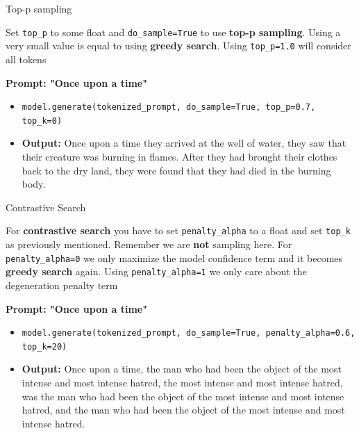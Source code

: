 \documentclass[11pt,compress,t,notes=noshow, xcolor=table]{beamer}
\begin{document}

\begin{vbframe}{Top-p sampling}

\vfill

Set \texttt{top\_p} to some float and \texttt{do\_sample=True} to use \textbf{top-p sampling}. Using a very small value is equal to using \textbf{greedy search}. Using \texttt{top\_p=1.0} will consider all tokens

\textbf{Prompt: "Once upon a time"}

\begin{itemize}
    \item \texttt{model.generate(tokenized\_prompt, do\_sample=True, top\_p=0.7, top\_k=0)}
    \item \textbf{Output:} Once upon a time they arrived at the well of water, they saw that their creature was burning in flames. After they had brought their clothes back to the dry land, they were found that they had died in the burning body.
\end{itemize}

\vfill
    
\end{vbframe}


\begin{vbframe}{Contrastive Search}

\vfill

For \textbf{contrastive search} you have to set \texttt{penalty\_alpha} to a float and set \texttt{top\_k} as previously mentioned. Remember we are \textbf{not} sampling here. For \texttt{penalty\_alpha=0} we only maximize the model confidence term and it becomes \textbf{greedy search} again. Using \texttt{penalty\_alpha=1} we only care about the degeneration penalty term

\textbf{Prompt: "Once upon a time"}

\begin{itemize}
    \item \texttt{model.generate(tokenized\_prompt, do\_sample=True, penalty\_alpha=0.6, top\_k=20)}
    \item \textbf{Output:} Once upon a time, the man who had been the object of the most intense and most intense hatred, the most intense and most intense hatred, was the man who had been the object of the most intense and most intense hatred, and the man who had been the object of the most intense and most intense hatred.
\end{itemize}

\vfill
    
\end{vbframe}
\end{document}
